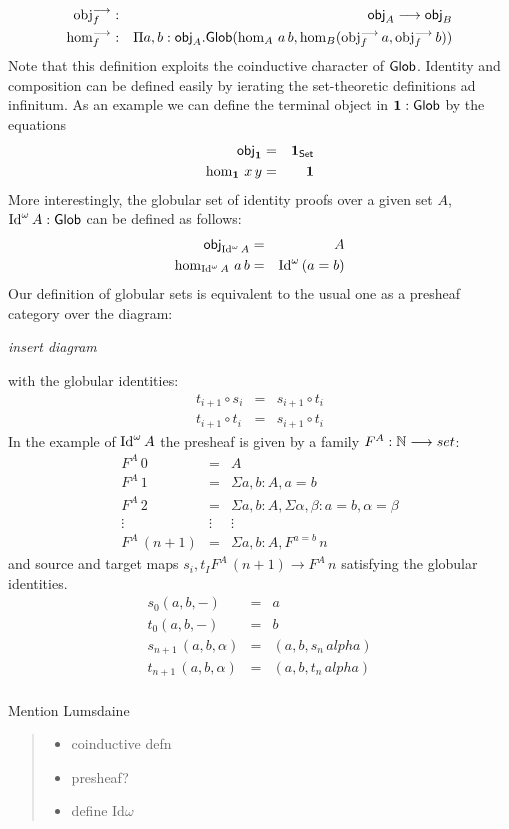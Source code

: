 \begin{eqnarray*}
  \mathrm{obj}^{\longrightarrow}_f & : & \mathsf{obj}_A \longrightarrow \mathsf{obj}_B \\
  \mathrm{hom}^{\longrightarrow}_f & : & \Pi a,b:\mathsf{obj}_A. \mathsf{Glob}(\hom_A\,a\,b,\hom_B(\mathrm{obj}^{\longrightarrow}_f\,a,\mathrm{obj}^{\longrightarrow}_f\,b))
\end{eqnarray*}
Note that this definition exploits the coinductive character of
$\mathsf{Glob}$. Identity and composition can be defined easily by ierating
the set-theoretic definitions ad infinitum. As an example we can
define the terminal object in $\mathbf{1} : \mathsf{Glob}$ by the equations
\begin{eqnarray*}
  \mathsf{obj}_{\mathbf{1}} & = & \mathbf{1}_{\mathsf{Set}} \\
  \hom_{\mathbf{1}}\,x\,y & = & \mathbf{1}
\end{eqnarray*}
More interestingly, the globular set of identity proofs over a given
set $A$, $\mathrm{Id}^\omega\,A : \mathsf{Glob}$ can be defined as follows:
\begin{eqnarray*}
\mathsf{obj}_{\mathrm{Id}^\omega\,A} & = & A \\
\hom_{\mathrm{Id}^\omega\,A}\,a\,b & = & \mathrm{Id}^\omega\,(a = b)
\end{eqnarray*}
Our definition of globular sets is equivalent to the usual one as a
presheaf category over the diagram:

\emph{insert diagram}

with the globular identities:
\begin{eqnarray*}
  t_{i+1} \circ s_i & = & s_{i+1} \circ t_i \\
  t_{i+1} \circ t_i & = & s_{i+1} \circ t_i
\end{eqnarray*}
In the example of $\mathrm{Id}^\omega\,A$ the presheaf is given by a family
$F^A : \mathbb{N} \longrightarrow set$:
\begin{eqnarray*}
  F^A\,0 & = & A\\
  F^A\,1 & = & \Sigma a,b : A,a = b\\
  F^A\,2 & = & \Sigma a,b : A,\Sigma \alpha,\beta: a = b, \alpha = \beta\\
  \vdots & \vdots & \vdots \\
  F^A\,(n+1) & = & \Sigma a,b:A,F^{a = b}\,n
\end{eqnarray*}
and source and target maps $s_i,t_I  F^A\,(n+1) \to F^A\,n$ satisfying the globular identities. 
\begin{eqnarray*}
s_0 (a,b,-) & = & a \\
t_0 (a,b,-) & = & b \\  
s_{n+1}\,(a,b,\alpha)  & = & (a , b, s_n\,alpha) \\
t_{n+1}\,(a,b,\alpha)  & = & (a , b, t_n\,alpha) \\
\end{eqnarray*}

Mention Lumsdaine


\begin{quote}
  \begin{itemize}\item coinductive defn
  \item presheaf?
  \item define Id$\omega$
  \end{itemize}
\end{quote}
 
